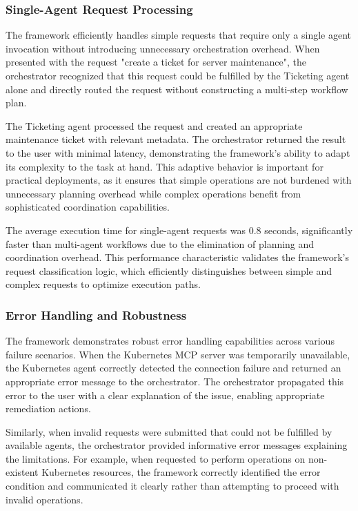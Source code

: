 \documentclass{article}
\begin{document}
\subsubsection{Single-Agent Request Processing}

The framework efficiently handles simple requests that require only a single agent invocation without introducing unnecessary orchestration overhead. When presented with the request "create a ticket for server maintenance", the orchestrator recognized that this request could be fulfilled by the Ticketing agent alone and directly routed the request without constructing a multi-step workflow plan.

The Ticketing agent processed the request and created an appropriate maintenance ticket with relevant metadata. The orchestrator returned the result to the user with minimal latency, demonstrating the framework's ability to adapt its complexity to the task at hand. This adaptive behavior is important for practical deployments, as it ensures that simple operations are not burdened with unnecessary planning overhead while complex operations benefit from sophisticated coordination capabilities.

The average execution time for single-agent requests was 0.8 seconds, significantly faster than multi-agent workflows due to the elimination of planning and coordination overhead. This performance characteristic validates the framework's request classification logic, which efficiently distinguishes between simple and complex requests to optimize execution paths.

\subsubsection{Error Handling and Robustness}

The framework demonstrates robust error handling capabilities across various failure scenarios. When the Kubernetes MCP server was temporarily unavailable, the Kubernetes agent correctly detected the connection failure and returned an appropriate error message to the orchestrator. The orchestrator propagated this error to the user with a clear explanation of the issue, enabling appropriate remediation actions.

Similarly, when invalid requests were submitted that could not be fulfilled by available agents, the orchestrator provided informative error messages explaining the limitations. For example, when requested to perform operations on non-existent Kubernetes resources, the framework correctly identified the error condition and communicated it clearly rather than attempting to proceed with invalid operations.
\end{document}

